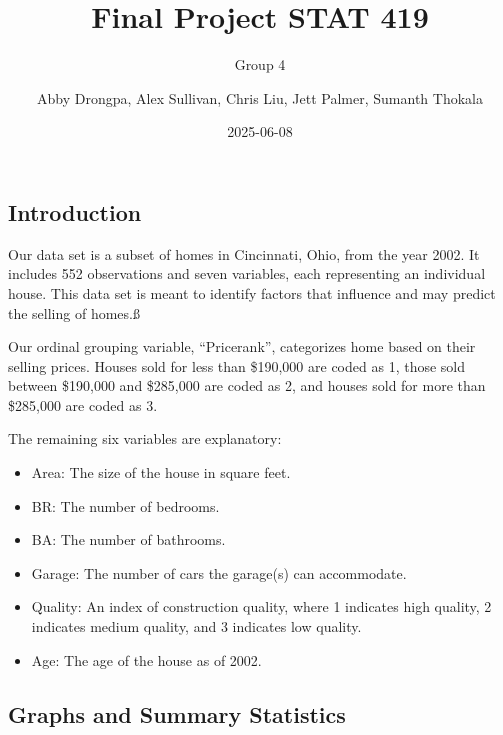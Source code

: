 \documentclass[
  letterpaper,
  DIV=11,
  numbers=noendperiod]{scrartcl}
\title{Final Project \textbar{} STAT 419}
\subtitle{Group 4}
\author{Abby Drongpa, Alex Sullivan, Chris Liu, Jett Palmer, Sumanth
Thokala}
\date{2025-06-08}
\begin{document}
\maketitle
\ifdefined\Shaded\renewenvironment{Shaded}{\begin{tcolorbox}[interior hidden, frame hidden, borderline west={3pt}{0pt}{shadecolor}, enhanced, sharp corners, boxrule=0pt, breakable]}{\end{tcolorbox}}\fi

\newpage{}

\hypertarget{introduction}{%
\subsection{Introduction}\label{introduction}}

Our data set is a subset of homes in Cincinnati, Ohio, from the year
2002. It includes 552 observations and seven variables, each
representing an individual house. This data set is meant to identify
factors that influence and may predict the selling of homes.ß

Our ordinal grouping variable, ``Pricerank'', categorizes home based on
their selling prices. Houses sold for less than \$190,000 are coded as
1, those sold between \$190,000 and \$285,000 are coded as 2, and houses
sold for more than \$285,000 are coded as 3.

The remaining six variables are explanatory:

\begin{itemize}
\item
  Area: The size of the house in square feet.
\item
  BR: The number of bedrooms.
\item
  BA: The number of bathrooms.
\item
  Garage: The number of cars the garage(s) can accommodate.
\item
  Quality: An index of construction quality, where 1 indicates high
  quality, 2 indicates medium quality, and 3 indicates low quality.
\item
  Age: The age of the house as of 2002.
\end{itemize}

\hypertarget{graphs-and-summary-statistics}{%
\subsection{Graphs and Summary
Statistics}\label{graphs-and-summary-statistics}}
\end{document}
